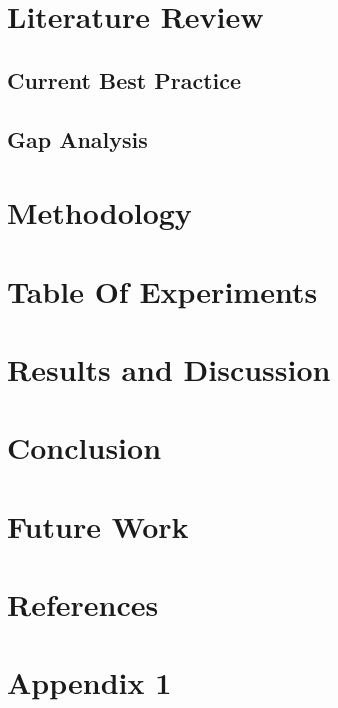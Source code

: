 \documentclass[11pt]{article}
\begin{document}
\section{Literature Review}

\subsection{Current Best Practice}

\subsection{Gap Analysis}

\section{Methodology}

\section{Table Of Experiments}

\section{Results and Discussion}

\section{Conclusion}

\section{Future Work}

\section{References}

\section{Appendix 1}
\end{document}
